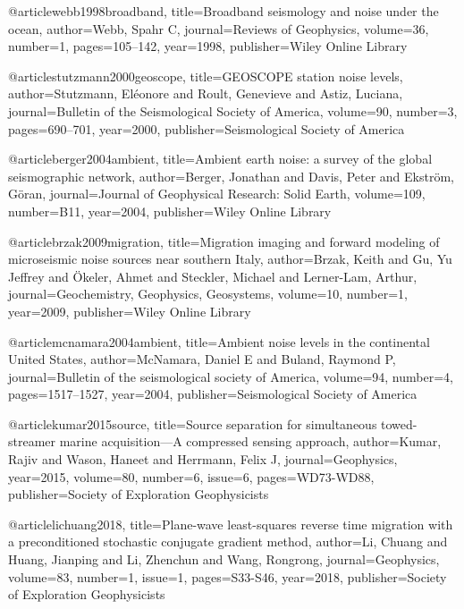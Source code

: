 @article{webb1998broadband,
  title={Broadband seismology and noise under the ocean},
  author={Webb, Spahr C},
  journal={Reviews of Geophysics},
  volume={36},
  number={1},
  pages={105--142},
  year={1998},
  publisher={Wiley Online Library}
}

@article{stutzmann2000geoscope,
  title={GEOSCOPE station noise levels},
  author={Stutzmann, El{\'e}onore and Roult, Genevieve and Astiz, Luciana},
  journal={Bulletin of the Seismological Society of America},
  volume={90},
  number={3},
  pages={690--701},
  year={2000},
  publisher={Seismological Society of America}
}

@article{berger2004ambient,
  title={Ambient earth noise: a survey of the global seismographic network},
  author={Berger, Jonathan and Davis, Peter and Ekstr{\"o}m, G{\"o}ran},
  journal={Journal of Geophysical Research: Solid Earth},
  volume={109},
  number={B11},
  year={2004},
  publisher={Wiley Online Library}
}

@article{brzak2009migration,
  title={Migration imaging and forward modeling of microseismic noise sources near southern Italy},
  author={Brzak, Keith and Gu, Yu Jeffrey and {\"O}keler, Ahmet and Steckler, Michael and Lerner-Lam, Arthur},
  journal={Geochemistry, Geophysics, Geosystems},
  volume={10},
  number={1},
  year={2009},
  publisher={Wiley Online Library}
}


@article{mcnamara2004ambient,
  title={Ambient noise levels in the continental United States},
  author={McNamara, Daniel E and Buland, Raymond P},
  journal={Bulletin of the seismological society of America},
  volume={94},
  number={4},
  pages={1517--1527},
  year={2004},
  publisher={Seismological Society of America}
}




@article{kumar2015source,
  title={Source separation for simultaneous towed-streamer marine acquisition—A compressed sensing approach},
  author={Kumar, Rajiv and Wason, Haneet and Herrmann, Felix J},
  journal={Geophysics},
  year={2015},
  volume=80,
  number=6,
  issue=6,
  pages={WD73-WD88},
  publisher={Society of Exploration Geophysicists}
}

@article{lichuang2018,
  title={Plane-wave least-squares reverse time migration with a preconditioned stochastic conjugate gradient method},
  author={Li, Chuang and Huang, Jianping and Li, Zhenchun and Wang, Rongrong},
  journal={Geophysics},
  volume={83},
  number={1},
  issue=1,
  pages={S33-S46},
  year={2018},
  publisher={Society of Exploration Geophysicists}
}


